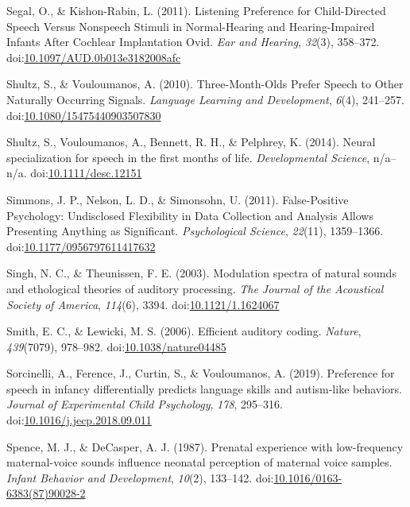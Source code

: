 \documentclass[man]{apa6}
\begin{document}
\hypertarget{ref-segal_listening_2011}{}
Segal, O., \& Kishon-Rabin, L. (2011). Listening Preference for
Child-Directed Speech Versus Nonspeech Stimuli in Normal-Hearing and
Hearing-Impaired Infants After Cochlear Implantation Ovid. \emph{Ear and
Hearing}, \emph{32}(3), 358--372.
doi:\href{https://doi.org/10.1097/AUD.0b013e3182008afc}{10.1097/AUD.0b013e3182008afc}

\hypertarget{ref-shultz_three-month-olds_2010}{}
Shultz, S., \& Vouloumanos, A. (2010). Three-Month-Olds Prefer Speech to
Other Naturally Occurring Signals. \emph{Language Learning and
Development}, \emph{6}(4), 241--257.
doi:\href{https://doi.org/10.1080/15475440903507830}{10.1080/15475440903507830}

\hypertarget{ref-shultz_neural_2014}{}
Shultz, S., Vouloumanos, A., Bennett, R. H., \& Pelphrey, K. (2014).
Neural specialization for speech in the first months of life.
\emph{Developmental Science}, n/a--n/a.
doi:\href{https://doi.org/10.1111/desc.12151}{10.1111/desc.12151}

\hypertarget{ref-simmons_false-positive_2011}{}
Simmons, J. P., Nelson, L. D., \& Simonsohn, U. (2011). False-Positive
Psychology: Undisclosed Flexibility in Data Collection and Analysis
Allows Presenting Anything as Significant. \emph{Psychological Science},
\emph{22}(11), 1359--1366.
doi:\href{https://doi.org/10.1177/0956797611417632}{10.1177/0956797611417632}

\hypertarget{ref-singh_modulation_2003}{}
Singh, N. C., \& Theunissen, F. E. (2003). Modulation spectra of natural
sounds and ethological theories of auditory processing. \emph{The
Journal of the Acoustical Society of America}, \emph{114}(6), 3394.
doi:\href{https://doi.org/10.1121/1.1624067}{10.1121/1.1624067}

\hypertarget{ref-smith_efficient_2006}{}
Smith, E. C., \& Lewicki, M. S. (2006). Efficient auditory coding.
\emph{Nature}, \emph{439}(7079), 978--982.
doi:\href{https://doi.org/10.1038/nature04485}{10.1038/nature04485}

\hypertarget{ref-sorcinelli_preference_2019}{}
Sorcinelli, A., Ference, J., Curtin, S., \& Vouloumanos, A. (2019).
Preference for speech in infancy differentially predicts language skills
and autism-like behaviors. \emph{Journal of Experimental Child
Psychology}, \emph{178}, 295--316.
doi:\href{https://doi.org/10.1016/j.jecp.2018.09.011}{10.1016/j.jecp.2018.09.011}

\hypertarget{ref-spence_prenatal_1987}{}
Spence, M. J., \& DeCasper, A. J. (1987). Prenatal experience with
low-frequency maternal-voice sounds influence neonatal perception of
maternal voice samples. \emph{Infant Behavior and Development},
\emph{10}(2), 133--142.
doi:\href{https://doi.org/10.1016/0163-6383(87)90028-2}{10.1016/0163-6383(87)90028-2}
\end{document}
